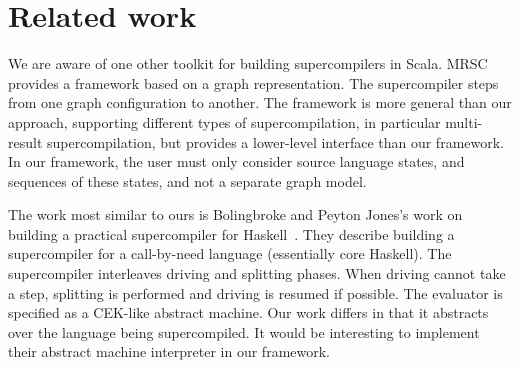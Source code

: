\section{Related work}
\label{sec:related}

We are aware of one other toolkit for building supercompilers in Scala. MRSC~\cite{mrsc}
provides a framework based on a graph representation.
The supercompiler steps from one graph configuration to another.
The framework is more general than our approach, supporting different types
of supercompilation, in particular multi-result supercompilation, but
provides a lower-level interface than our framework.
In our framework, the user must only consider source language states,
and sequences of these states, and not a separate graph model.

The work most similar to ours is Bolingbroke
and Peyton Jones's work on building a practical supercompiler for
Haskell~\cite{supercompilation-by-eval}.
They describe building a supercompiler for
a call-by-need language (essentially core Haskell).
The supercompiler interleaves driving and splitting phases.
When driving cannot take a step, splitting is performed and driving is resumed if possible.
The evaluator is specified as a CEK-like abstract machine.
Our work differs in that it abstracts over the language being supercompiled.
It would be interesting to implement their abstract machine interpreter in our framework.



